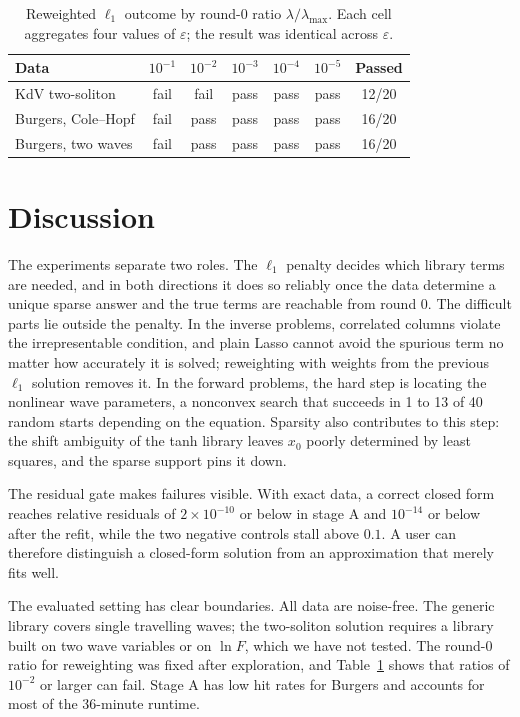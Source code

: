 \documentclass{article}
\begin{document}
\begin{table}[t]
\caption{Reweighted $\ell_1$ outcome by round-0 ratio $\lambda/\lambda_{\max}$. Each cell aggregates four values of $\varepsilon$; the result was identical across $\varepsilon$.}
\label{tab:sensitivity}
\centering
\small
\begin{tabular}{lcccccc}
\toprule
Data & $10^{-1}$ & $10^{-2}$ & $10^{-3}$ & $10^{-4}$ & $10^{-5}$ & Passed \\
\midrule
KdV two-soliton & fail & fail & pass & pass & pass & 12/20 \\
Burgers, Cole--Hopf & fail & pass & pass & pass & pass & 16/20 \\
Burgers, two waves & fail & pass & pass & pass & pass & 16/20 \\
\bottomrule
\end{tabular}
\end{table}

\section{Discussion}
\label{sec:discussion}

The experiments separate two roles. The $\ell_1$ penalty decides which library terms are needed, and in both directions it does so reliably once the data determine a unique sparse answer and the true terms are reachable from round 0. The difficult parts lie outside the penalty. In the inverse problems, correlated columns violate the irrepresentable condition, and plain Lasso cannot avoid the spurious term no matter how accurately it is solved; reweighting with weights from the previous $\ell_1$ solution removes it. In the forward problems, the hard step is locating the nonlinear wave parameters, a nonconvex search that succeeds in 1 to 13 of 40 random starts depending on the equation. Sparsity also contributes to this step: the shift ambiguity of the tanh library leaves $x_0$ poorly determined by least squares, and the sparse support pins it down.

The residual gate makes failures visible. With exact data, a correct closed form reaches relative residuals of $2\times10^{-10}$ or below in stage A and $10^{-14}$ or below after the refit, while the two negative controls stall above $0.1$. A user can therefore distinguish a closed-form solution from an approximation that merely fits well.

The evaluated setting has clear boundaries. All data are noise-free. The generic library covers single travelling waves; the two-soliton solution requires a library built on two wave variables or on $\ln F$, which we have not tested. The round-0 ratio for reweighting was fixed after exploration, and Table~\ref{tab:sensitivity} shows that ratios of $10^{-2}$ or larger can fail. Stage A has low hit rates for Burgers and accounts for most of the 36-minute runtime.
\end{document}
